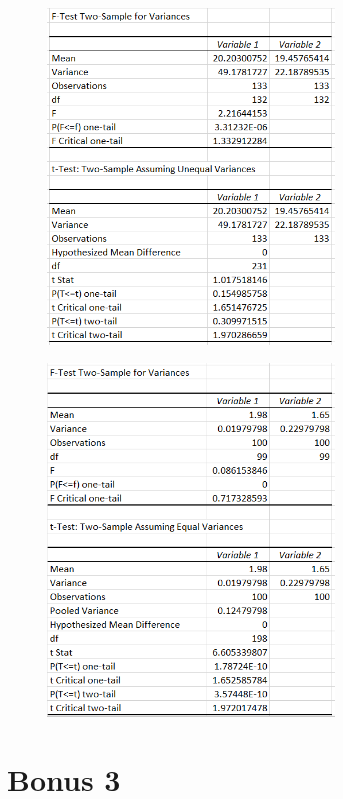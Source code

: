 \documentclass[11pt]{article}
\begin{document}
\begin{figure}[H]
\begin{minipage}{.5\textwidth}
  \includegraphics[width=3in]{assn1d_statanal_obj1.png}
  \label{fig:statanal1}
\end{minipage}%
\begin{minipage}{.5\textwidth}
  \includegraphics[width=3in]{assn1d_statanal_obj2.png}
  \label{fig:statanal2}
\end{minipage}
\end{figure}

\section{Bonus 3}\label{sect:bonus3}
\end{document}
